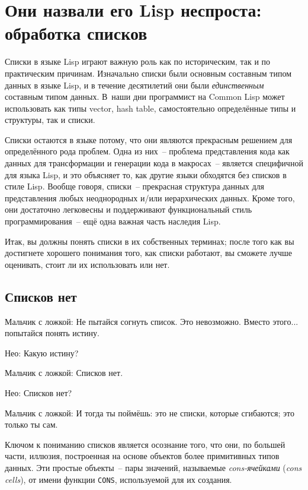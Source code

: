 \chapter{Они назвали его Lisp неспроста: обработка списков}
\label{ch:12}

\thispagestyle{empty}

Списки в языке Lisp играют важную роль как по историческим, так и по практическим
причинам. Изначально списки были основным составным типом данных в языке Lisp, и в течение
десятилетий они были \textit{единственным} составным типом данных. В~наши дни программист на
Common Lisp может использовать как типы vector, hash table, самостоятельно определённые
типы и структуры, так и списки.

Списки остаются в языке потому, что они являются прекрасным решением для определённого
рода проблем. Одна из них~-- проблема представления кода как данных для трансформации и
генерации кода в макросах~-- является специфичной для языка Lisp, и это объясняет то, как
другие языки обходятся без списков в стиле Lisp. Вообще говоря, списки~-- прекрасная
структура данных для представления любых неоднородных и/или иерархических данных. Кроме
того, они достаточно легковесны и поддерживают функциональный стиль программирования~-- ещё
одна важная часть наследия Lisp.

Итак, вы должны понять списки в их собственных терминах; после того как вы достигнете
хорошего понимания того, как списки работают, вы сможете лучше оценивать, стоит ли их
использовать или нет.

\section{Списков нет}

Мальчик с ложкой: Не пытайся согнуть список. Это невозможно. Вместо этого... попытайся
понять истину.

Нео: Какую истину?

Мальчик с ложкой: Списков нет.

Нео: Списков нет?

Мальчик с ложкой: И тогда ты поймёшь: это не списки, которые сгибаются; это только ты
сам.

Ключом к пониманию списков является осознание того, что они, по большей части, иллюзия,
построенная на основе объектов более примитивных типов данных. Эти простые объекты~-- пары
значений, называемые \textit{cons-ячейками} (\textit{cons cells}), от имени функции
\lstinline{CONS}, используемой для их создания.

